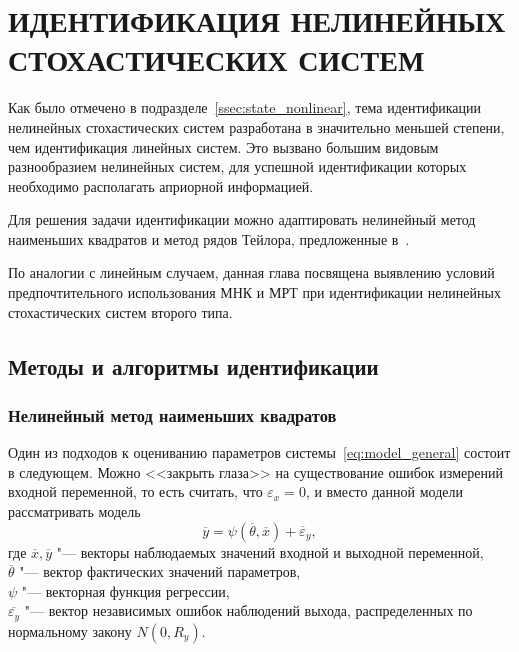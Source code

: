 \chapter[Идентификация нелинейных стохастических систем второго типа]{%
  ИДЕНТИФИКАЦИЯ НЕЛИНЕЙНЫХ СТОХАСТИЧЕСКИХ СИСТЕМ
}

Как было отмечено в подразделе~\ref{ssec:state_nonlinear},
тема идентификации нелинейных стохастических систем разработана
в значительно меньшей степени, чем идентификация линейных систем. Это
вызвано большим видовым разнообразием нелинейных систем, для успешной
идентификации которых необходимо располагать априорной информацией.

Для решения задачи идентификации можно адаптировать нелинейный метод
наименьших квадратов и метод рядов Тейлора, предложенные в~\cite{mukha_2009, mukha_2000}.

По аналогии с линейным случаем, данная глава посвящена выявлению
условий предпочтительного использования МНК и МРТ при идентификации
нелинейных стохастических систем второго типа.

\section{Методы и алгоритмы идентификации}

\subsection{Нелинейный метод наименьших квадратов}\label{ssec:nonlinear_method_lse}

Один из подходов к оцениванию параметров системы~\eqref{eq:model_general}
состоит в следующем.
Можно <<закрыть глаза>> на существование ошибок измерений
входной переменной, то есть считать, что \( \varepsilon_x = 0 \),
и вместо данной модели рассматривать модель
\begin{equation*}
  \overline{y} = \psi(\overline{\theta}, \overline{x}) + \overline{\varepsilon}_y,
\end{equation*}
где \( \overline{x}, \overline{y} \)
"--- векторы наблюдаемых значений входной и выходной переменной, \\
\hspace*{7mm} \( \overline{\theta} \)
"--- вектор фактических значений параметров, \\
\hspace*{7mm} \( \psi \)
"--- векторная функция регрессии, \\
\hspace*{7mm} \( \overline{\varepsilon_y} \)
"--- вектор независимых ошибок наблюдений выхода,
распределенных по нормальному закону \( N(0, R_y) \).

